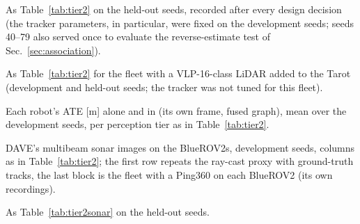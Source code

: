 \begin{table}[t]
  \centering
  \caption{As Table~\ref{tab:tier2} on the held-out seeds, recorded after every design decision
  (the tracker parameters, in particular, were fixed on the development seeds; seeds 40--79 also
  served once to evaluate the reverse-estimate test of Sec.~\ref{sec:association}).}
  \label{tab:tier2held}
  \scriptsize
  \setlength{\tabcolsep}{3pt}
\end{table}

\begin{table}[t]
  \centering
  \caption{As Table~\ref{tab:tier2} for the fleet with a VLP-16-class LiDAR added to the Tarot
  (development and held-out seeds; the tracker was not tuned for this fleet).}
  \label{tab:tier2lidar}
  \scriptsize
  \setlength{\tabcolsep}{3pt}
\end{table}

\begin{table}[t]
  \centering
  \caption{Each robot's ATE [m] alone and in \avatar{} (its own frame, fused graph), mean over
  the development seeds, per perception tier as in Table~\ref{tab:tier2}.}
  \label{tab:tier2agents}
  \scriptsize
  \setlength{\tabcolsep}{3pt}
\end{table}

\begin{table}[t]
  \centering
  \caption{DAVE's multibeam sonar images on the BlueROV2s, development seeds, columns as in
  Table~\ref{tab:tier2}; the first row repeats the ray-cast proxy with ground-truth tracks, the
  last block is the fleet with a Ping360 on each BlueROV2 (its own recordings).}
  \label{tab:tier2sonar}
  \scriptsize
  \setlength{\tabcolsep}{3pt}
\end{table}

\begin{table}[t]
  \centering
  \caption{As Table~\ref{tab:tier2sonar} on the held-out seeds.}
  \label{tab:tier2sonarheld}
  \scriptsize
  \setlength{\tabcolsep}{3pt}
\end{table}

